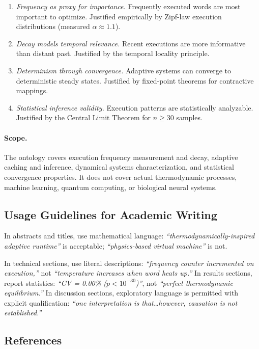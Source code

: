 \begin{enumerate}
  \item \emph{Frequency as proxy for importance.} Frequently executed words
    are most important to optimize. Justified empirically by Zipf-law
    execution distributions (measured $\alpha \approx 1.1$).
  \item \emph{Decay models temporal relevance.} Recent executions are more
    informative than distant past. Justified by the temporal locality
    principle.
  \item \emph{Determinism through convergence.} Adaptive systems can converge
    to deterministic steady states. Justified by fixed-point theorems for
    contractive mappings.
  \item \emph{Statistical inference validity.} Execution patterns are
    statistically analyzable. Justified by the Central Limit Theorem for
    $n \geq 30$ samples.
\end{enumerate}

\paragraph{Scope.}
The ontology covers execution frequency measurement and decay, adaptive
caching and inference, dynamical systems characterization, and statistical
convergence properties. It does not cover actual thermodynamic processes,
machine learning, quantum computing, or biological neural systems.

\subsection{Usage Guidelines for Academic Writing}

In abstracts and titles, use mathematical language:
\emph{``thermodynamically-inspired adaptive runtime''} is acceptable;
\emph{``physics-based virtual machine''} is not.

In technical sections, use literal descriptions: \emph{``frequency counter
incremented on execution,''} not \emph{``temperature increases when word heats
up.''} In results sections, report statistics: \emph{``CV = 0.00\%
($p < 10^{-30}$)''}, not \emph{``perfect thermodynamic equilibrium.''} In
discussion sections, exploratory language is permitted with explicit
qualification: \emph{``one interpretation is that\ldots however, causation
is not established.''}

\subsection{References}

